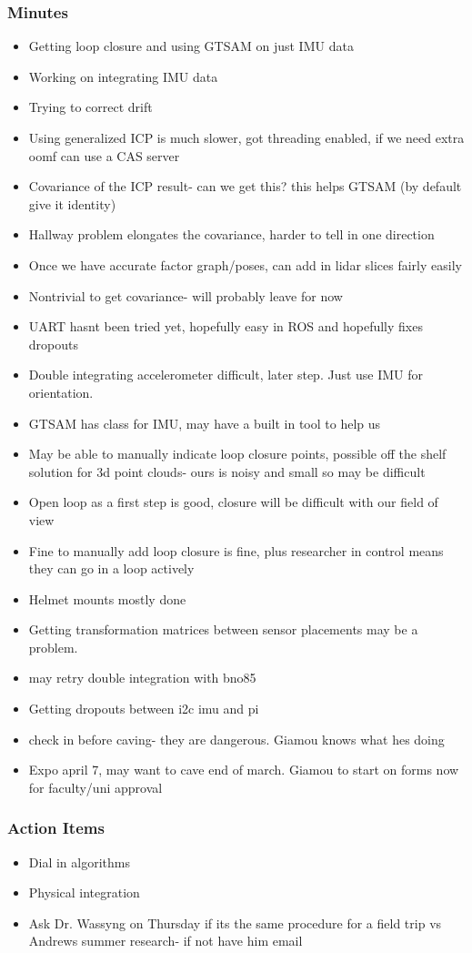 		\subsubsection*{Minutes}
			\begin{itemize}
				\item Getting loop closure and using GTSAM on just IMU data
				\item Working on integrating IMU data
				\item Trying to correct drift
				\item Using generalized ICP is much slower, got threading enabled, if we need extra oomf can use a CAS server
				\item Covariance of the ICP result- can we get this? this helps GTSAM (by default give it identity)
				\item Hallway problem elongates the covariance, harder to tell in one direction
				\item Once we have accurate factor graph/poses, can add in lidar slices fairly easily
				\item Nontrivial to get covariance- will probably leave for now
				\item UART hasnt been tried yet, hopefully easy in ROS and hopefully fixes dropouts
				\item Double integrating accelerometer difficult, later step. Just use IMU for orientation.
				\item GTSAM has class for IMU, may have a built in tool to help us 
				\item May be able to manually indicate loop closure points, possible off the shelf solution for 3d point clouds- ours is noisy and small so may be difficult
				\item Open loop as a first step is good, closure will be difficult with our field of view 
				\item Fine to manually add loop closure is fine, plus researcher in control means they can go in a loop actively
				\item Helmet mounts mostly done 
				\item Getting transformation matrices between sensor placements may be a problem. 
				\item may retry double integration with bno85
				\item Getting dropouts between i2c imu and pi 
				\item check in before caving- they are dangerous. Giamou knows what hes doing
				\item Expo april 7, may want to cave end of march. Giamou to start on forms now for faculty/uni approval
			\end{itemize}

		\subsubsection*{Action Items}
			\begin{itemize}
				\item Dial in algorithms
				\item Physical integration
				\item Ask Dr. Wassyng on Thursday if its the same procedure for a field trip vs Andrews summer research- if not have him email
			\end{itemize}

